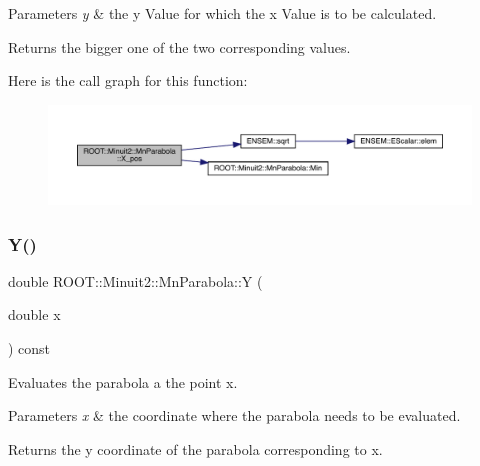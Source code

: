 \begin{DoxyParams}{Parameters}
{\em y} & the y Value for which the x Value is to be calculated.\\
\hline
\end{DoxyParams}
\begin{DoxyReturn}{Returns}
the bigger one of the two corresponding values. 
\end{DoxyReturn}
Here is the call graph for this function\+:
\nopagebreak
\begin{figure}[H]
\begin{center}
\leavevmode
\includegraphics[width=350pt]{db/d7d/classROOT_1_1Minuit2_1_1MnParabola_a2b4623df00488ca3d4175eb92123066e_cgraph}
\end{center}
\end{figure}
\mbox{\label{classROOT_1_1Minuit2_1_1MnParabola_af429c12e92f120e38f75147fd3fc857c}} 
\subsubsection{\texorpdfstring{Y()}{Y()}\hspace{0.1cm}{\footnotesize\ttfamily [1/3]}}
{\footnotesize\ttfamily double R\+O\+O\+T\+::\+Minuit2\+::\+Mn\+Parabola\+::Y (\begin{DoxyParamCaption}\item[{double}]{x }\end{DoxyParamCaption}) const\hspace{0.3cm}{\ttfamily [inline]}}

Evaluates the parabola a the point x.


\begin{DoxyParams}{Parameters}
{\em x} & the coordinate where the parabola needs to be evaluated.\\
\hline
\end{DoxyParams}
\begin{DoxyReturn}{Returns}
the y coordinate of the parabola corresponding to x. 
\end{DoxyReturn}
\mbox{\label{classROOT_1_1Minuit2_1_1MnParabola_af429c12e92f120e38f75147fd3fc857c}} 
